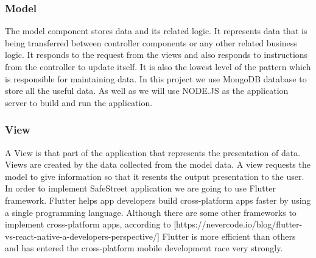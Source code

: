 \subsubsection{Model}
The model component stores data and its related logic. It represents data that is being transferred between controller components or any other related business logic. It responds to the request from the views and also responds to instructions from the controller to update itself. It is also the lowest level of the pattern which is responsible for maintaining data. In this project we use MongoDB database to store all the useful data. As well as we will use NODE.JS as the application server to build and run the application.

\subsubsection{View}
A View is that part of the application that represents the presentation of data.
Views are created by the data collected from the model data. A view requests the model to give information so that it resents the output presentation to the user.
In order to implement SafeStreet application we are going to use Flutter framework. Flutter helps app developers build cross-platform apps faster by using a single programming language. Although there are some other frameworks to implement cross-platform apps, according to [https://nevercode.io/blog/flutter-vs-react-native-a-developers-perspective/] Flutter is more efficient than others and has entered the cross-platform mobile development race very strongly.

